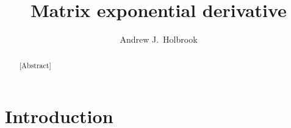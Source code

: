 \documentclass[12pt]{article} %
\title{Matrix exponential derivative}
\author{Andrew J.~Holbrook}
\affil{UCLA Biostatistics}
\begin{document}
\maketitle




\begin{abstract}

[Abstract]


\end{abstract}



\section{Introduction}\label{sec:intro}


\newcommand{\QQ}{\mathbf{Q}}
\newcommand{\MM}{\mathbf{M}}
\newcommand{\JJ}{\mathbf{J}}
\newcommand{\II}{\mathbf{I}}
\newcommand{\RR}{\mathbf{R}}
\newcommand{\Zero}{\boldsymbol{0}}
\newcommand{\ttheta}{\boldsymbol{\theta}}
\end{document}
